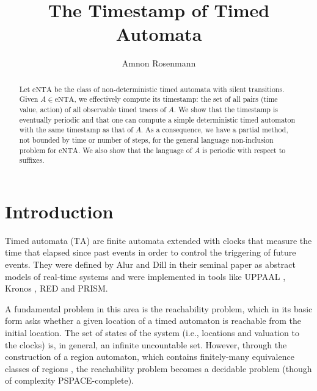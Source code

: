 \documentclass[11pt]{amsart}
\theoremstyle{definition}
\newcommand{\ta}{\mathrm{TA}}
\newcommand{\ntaeps}{\mathrm{eNTA}}
\begin{document}
\title{The Timestamp of Timed Automata}
\author{Amnon Rosenmann}
\address{Graz University of Technology, Steyrergasse 30, A-8010 Graz, Austria}



\date{}
\maketitle

\begin{abstract}
Let $\ntaeps$ be the class of non-deterministic timed automata with silent transitions. Given $A \in \ntaeps$, we effectively compute its timestamp: the set of all pairs (time value, action) of all observable timed traces of $A$. We show that the timestamp is eventually periodic and that one can compute a simple deterministic timed automaton with the same timestamp as that of $A$. As a consequence, we have a partial method, not bounded by time or number of steps, for the general language non-inclusion problem for $\ntaeps$. We also show that the language of $A$ is periodic with respect to suffixes. 
\end{abstract}
\section{Introduction}
\label{sec:intro}
Timed automata ($\ta$) are finite automata extended with clocks that measure the time that elapsed since past events in order to control the triggering of future events.
They were defined by Alur and Dill in their seminal paper \cite{ta} as abstract models of real-time systems and were implemented in tools like UPPAAL \cite{uppaal}, Kronos \cite{Kronos98}, RED \cite{Wang04} and PRISM\cite{Prism11}.

A fundamental problem in this area is the reachability problem, which in its basic form asks whether a given location of a timed automaton is reachable from the initial location.
The set of states of the system (i.e., locations and valuation to the clocks) is, in general, an infinite uncountable set.
However, through the construction of a region automaton, which contains finitely-many equivalence classes of regions \cite{ta}, the reachability problem becomes a decidable problem (though of complexity PSPACE-complete).
\end{document}
